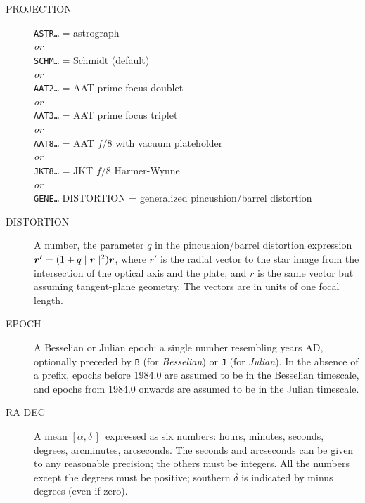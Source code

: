\documentclass[twoside,11pt]{article}
\newcommand{\xlabel}[1]{}
\renewcommand{\_}{\texttt{\symbol{95}}}
\newcommand{\radec}     {$[\alpha,\delta\,]$}
\begin{document}
\begin{description}
\goodbreak
\item[\xlabel{PROJECTION}PROJECTION]\mbox{}

 \texttt{ASTR\ldots} = astrograph \\
 \textit{or} \\
 \texttt{SCHM\ldots} = Schmidt (default) \\
 \textit{or} \\
 \texttt{AAT2\ldots} = AAT prime focus doublet \\
 \textit{or} \\
 \texttt{AAT3\ldots} = AAT prime focus triplet \\
 \textit{or} \\
 \texttt{AAT8\ldots} = AAT $f/8$ with vacuum plateholder \\
 \textit{or} \\
 \texttt{JKT8\ldots} = JKT $f/8$ Harmer-Wynne \\
 \textit{or} \\
 \texttt{GENE\ldots} DISTORTION = generalized pincushion/barrel distortion

\goodbreak
\item[\xlabel{PROJECTION}DISTORTION]\mbox{}

A number, the parameter $q$ in the pincushion/barrel distortion expression
$\mbox{\boldmath $r'$}=(1+q\mid\mbox{\boldmath $r$}\mid^2)\mbox{\boldmath $r$}$,
where \mbox{\boldmath $r'$} is the radial vector to the star image
from the intersection of the optical axis and the plate,
and \mbox{\boldmath $r$} is the same vector but assuming tangent-plane
geometry.  The vectors are in units of one focal length.

\goodbreak
\item[\xlabel{EPOCH}EPOCH]\mbox{}

A Besselian or Julian epoch:  a single number resembling years AD,
optionally preceded by \texttt{B} (for \textit{Besselian}) or
\texttt{J} (for \textit{Julian}).  In the absence of a prefix, epochs
before 1984.0 are assumed to be in the Besselian timescale, and epochs
from 1984.0 onwards are assumed to be in the Julian timescale.

\goodbreak
\item[\xlabel{RA_DEC}RA DEC]\mbox{}

A mean \radec\ expressed as six numbers: hours, minutes, seconds,
degrees, arcminutes, arcseconds.  The seconds and arcseconds can be
given to any reasonable precision;  the others must be integers.  All
the numbers except the degrees must be positive; southern $\delta$ is
indicated by minus degrees (even if zero).


\end{description}
\end{document}
